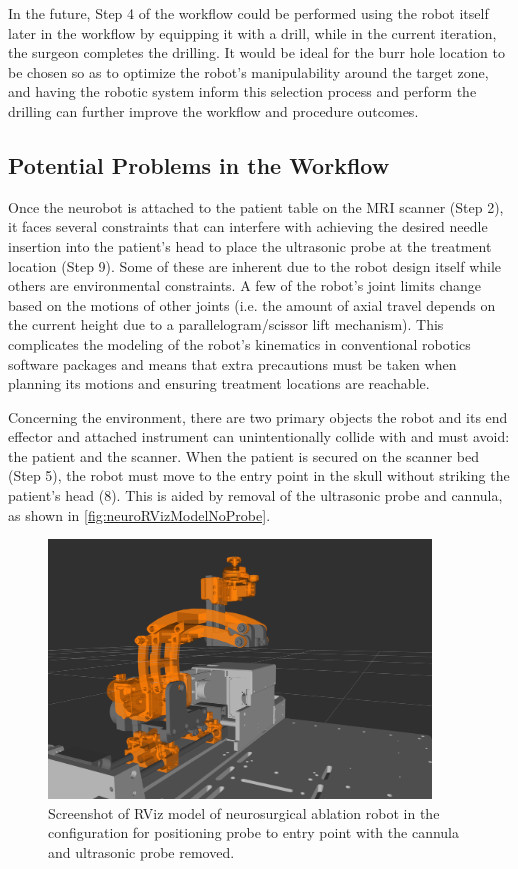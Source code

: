 \documentclass[12pt]{report}
\begin{document}
In the future, Step 4 of the workflow could be performed using the robot itself later in the workflow by equipping it with a drill, while in the current iteration, the surgeon completes the drilling. It would be ideal for the burr hole location to be chosen so as to optimize the robot's manipulability around the target zone, and having the robotic system inform this selection process and perform the drilling can further improve the workflow and procedure outcomes.

\subsection{Potential Problems in the Workflow}
Once the neurobot is attached to the patient table on the MRI scanner (Step 2), it faces several constraints that can interfere with achieving the desired needle insertion into the patient's head to place the ultrasonic probe at the treatment location (Step 9). Some of these are inherent due to the robot design itself while others are environmental constraints. A few of the robot's joint limits change based on the motions of other joints (i.e. the amount of axial travel depends on the current height due to a parallelogram/scissor lift mechanism). This complicates the modeling of the robot's kinematics in conventional robotics software packages and means that extra precautions must be taken when planning its motions and ensuring treatment locations are reachable.

Concerning the environment, there are two primary objects the robot and its end effector and attached instrument can unintentionally collide with and must avoid: the patient and the scanner. When the patient is secured on the scanner bed (Step 5), the robot must move to the entry point in the skull without striking the patient's head (8). This is aided by removal of the ultrasonic probe and cannula, as shown in \autoref{fig:neuroRVizModelNoProbe}. 

\begin{figure}[thpb]
	\centering
	\includegraphics[width = 4in]{images/neuro_no_probe.png}
    \caption{Screenshot of RViz model of neurosurgical ablation robot in the configuration for positioning probe to entry point with the cannula and ultrasonic probe removed. }
    \label{fig:neuroRVizModelNoProbe}
\end{figure}
\end{document}

